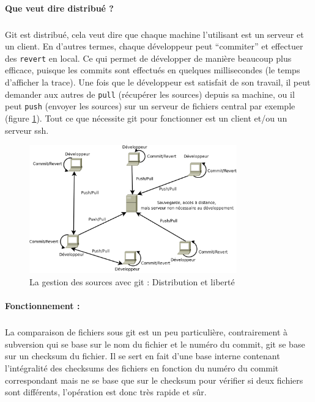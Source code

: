 \paragraph{Que veut dire distribué ?} 
\subparagraph{}Git est distribué, cela veut dire que chaque machine l'utilisant est un serveur et un client. En d'autres termes, chaque développeur peut ``commiter'' et effectuer des \verb|revert| en local. Ce qui permet de développer de manière beaucoup plus efficace, puisque les commits sont effectués en quelques millisecondes (le temps d'afficher la trace). Une fois que le développeur est satisfait de son travail, il peut demander aux autres de \verb|pull| (récupérer les sources) depuis sa machine, ou il peut \verb|push| (envoyer les sources) sur un serveur de fichiers central par exemple (figure \ref{git}). Tout ce que nécessite git pour fonctionner est un client et/ou un serveur ssh.


\begin{figure}[H]
\begin{center}
        \includegraphics[width=0.8\textwidth]{./schema/git.png}
\caption{La gestion des sources avec git : Distribution et liberté}
\label{git}
\end{center}
\end{figure}

\paragraph{Fonctionnement :} 

\subparagraph{}La comparaison de fichiers sous git est un peu particulière, contrairement à subversion qui se base sur le nom du fichier et le numéro du commit, git se base sur un checksum du fichier. Il se sert en fait d'une base interne contenant l'intégralité des checksums des fichiers en fonction du numéro du commit correspondant mais ne se base que sur le checksum pour vérifier si deux fichiers sont différents, l'opération est donc très rapide et sûr.

